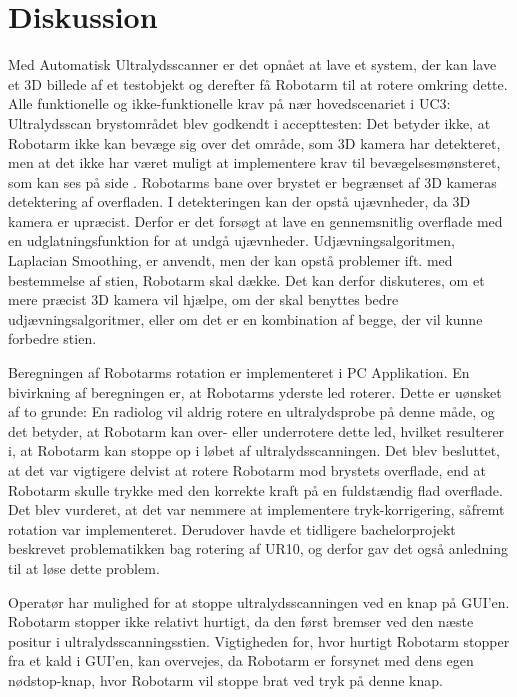 \chapter{Diskussion}\label{kapitel_Diskussion}
Med Automatisk Ultralydsscanner er det opnået at lave et system, der kan lave et 3D billede af et testobjekt og derefter få Robotarm til at rotere omkring dette. Alle funktionelle og ikke-funktionelle krav på nær hovedscenariet i UC3: Ultralydsscan brystområdet blev godkendt i accepttesten: \newline
Det betyder ikke, at Robotarm ikke kan bevæge sig over det område, som 3D kamera har detekteret, men at det ikke har været muligt at implementere krav til bevægelsesmønsteret, som kan ses på side \pageref{Probensbevagelse}. Robotarms bane over brystet er begrænset af 3D kameras detektering af overfladen. I detekteringen kan der opstå ujævnheder, da 3D kamera er upræcist. Derfor er det forsøgt at lave en gennemsnitlig overflade med en udglatningsfunktion for at undgå ujævnheder. Udjævningsalgoritmen, Laplacian Smoothing, er anvendt, men der kan opstå problemer ift. med  bestemmelse af stien, Robotarm skal dække. Det kan derfor diskuteres, om et mere præcist 3D kamera vil hjælpe, om der skal benyttes bedre udjævningsalgoritmer, eller om det er en kombination af begge, der vil kunne forbedre stien. 

Beregningen af Robotarms rotation er implementeret i PC Applikation. En bivirkning af beregningen er, at Robotarms yderste led roterer. Dette er uønsket af to grunde: En radiolog vil aldrig rotere en ultralydsprobe på denne måde, og det betyder, at Robotarm kan over- eller underrotere dette led, hvilket resulterer i, at Robotarm kan stoppe op i løbet af ultralydsscanningen. Det blev besluttet, at det var vigtigere delvist at rotere Robotarm mod brystets overflade, end at Robotarm skulle trykke med den korrekte kraft på en fuldstændig flad overflade. Det blev vurderet, at det var nemmere at implementere tryk-korrigering, såfremt rotation var implementeret. Derudover havde et tidligere bachelorprojekt beskrevet problematikken bag rotering af UR10, og derfor gav det også anledning til at løse dette problem.

Operatør har mulighed for at stoppe ultralydsscanningen ved en knap på GUI'en. Robotarm stopper ikke relativt hurtigt, da den først bremser ved den næste positur i ultralydsscanningsstien. Vigtigheden for, hvor hurtigt Robotarm stopper fra et kald i GUI'en, kan overvejes, da Robotarm er forsynet med dens egen nødstop-knap, hvor Robotarm vil stoppe brat ved tryk på denne knap.

